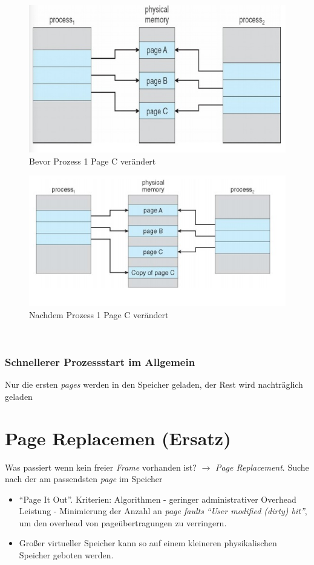 \documentclass[a4paper]{scrreprt}
\begin{document}
\begin{figure}[ht]
\centering
\includegraphics[scale=0.5]{graphics/cowbefore.png}
\caption{Bevor Prozess 1 Page C verändert}
\end{figure}

\begin{figure}[ht]
\centering
\includegraphics[scale=0.5]{graphics/cowafter.png}
\caption{Nachdem Prozess 1 Page C verändert}

\end{figure}

\ \\
\subsubsection{Schnellerer Prozessstart im Allgemein}
Nur die ersten \textit{pages} werden in den Speicher geladen, der Rest wird nachträglich geladen


\section{Page Replacemen (Ersatz)}
Was passiert wenn kein freier \textit{Frame} vorhanden ist? $\rightarrow$ \textit{Page Replacement}. Suche nach der am passendsten \textit{page} im Speicher
\begin{itemize}
\item "`Page It Out"'. Kriterien:
\subitem Algorithmen - geringer administrativer Overhead
\subitem Leistung - Minimierung der Anzahl an \textit{page faults}
\subitem \textit{"`User modified (dirty) bit"'}, um den overhead von pageübertragungen zu verringern.
\item Großer virtueller Speicher kann so auf einem kleineren physikalischen Speicher geboten werden.
\end{itemize}
\end{document}
